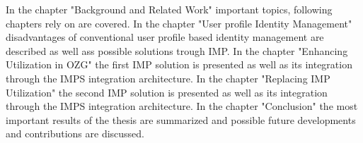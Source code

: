 In the chapter "Background and Related Work" important topics, following chapters rely on are covered.
In the chapter "User profile Identity Management" disadvantages of conventional user profile based identity management are described as well ass possible solutions trough IMP.
In the chapter "Enhancing Utilization in OZG" the first IMP solution is presented as well as its integration through the IMPS integration architecture.
In the chapter "Replacing IMP Utilization" the second IMP solution is presented as well as its integration through the IMPS integration architecture.
In the chapter "Conclusion" the most important results of the thesis are summarized and possible future developments and contributions are discussed.